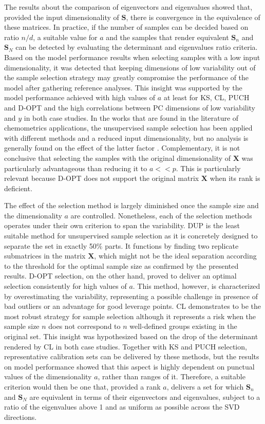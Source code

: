\documentclass[journal=ancham,manuscript=article]{achemso}
\begin{document}
The results about the comparison of eigenvectors and eigenvalues showed that, provided the input dimensionality of $\mathbf{S}$, there is convergence in the equivalence of these matrices. In practice, if the number of samples can be decided based on ratio $n/d$, a suitable value for $a$ and the samples that render equivalent $\mathbf{S}_n$ and $\mathbf{S}_N$ can be detected by evaluating the determinant and eigenvalues ratio criteria. Based on the model performance results when selecting samples with a low input dimensionality, it was detected that keeping dimensions of low variability out of the sample selection strategy may greatly compromise the performance of the model after gathering reference analyses. This insight was supported by the model performance achieved with high values of $a$ at least for KS, CL, PUCH and D-OPT and the high correlations between PC dimensions of low variability and $y$ in both case studies. In the works that are found in the literature of chemometrics applications, the unsupervised sample selection has been applied with different methods and a reduced input dimensionality, but no analysis is generally found on the effect of the latter factor \cite{Naes1990, Brandmaier2012, Nawar2018, Au2020}. Complementary, it is not conclusive that selecting the samples with the original dimensionality of $\mathbf{X}$ was particularly advantageous than reducing it to $a<<p$. This is particularly relevant because D-OPT does not support the original matrix $\mathbf{X}$ when its rank is deficient.

The effect of the selection method is largely diminished once the sample size and the dimensionality $a$ are controlled. Nonetheless, each of the selection methods operates under their own criterion to span the variability. DUP is the least suitable method for unsupervised sample selection as it is concretely designed to separate the set in exactly 50\% parts. It functions by finding two replicate submatrices in the matrix $\mathbf{X}$, which might not be the ideal separation according to the threshold for the optimal sample size as confirmed by the presented results. D-OPT selection, on the other hand, proved to deliver an optimal selection consistently for high values of $a$. This method, however, is characterized by overestimating the variability, representing a possible challenge in presence of bad outliers or an advantage for good leverage points. CL demonstrates to be the most robust strategy for sample selection although it represents a risk when the sample size $n$ does not correspond to $n$ well-defined groups existing in the original set. This insight was hypothesized based on the drop of the determinant rendered by CL in both case studies. Together with KS and PUCH selection, representative calibration sets can be delivered by these methods, but the results on model performance showed that this aspect is highly dependent on punctual values of the dimensionality $a$, rather than ranges of it. Therefore, a suitable criterion would then be one that, provided a rank $a$, delivers a set for which $\mathbf{S}_n$ and $\mathbf{S}_N$ are equivalent in terms of their eigenvectors and eigenvalues, subject to a ratio of the eigenvalues above 1 and as uniform as possible across the SVD directions.
\end{document}
